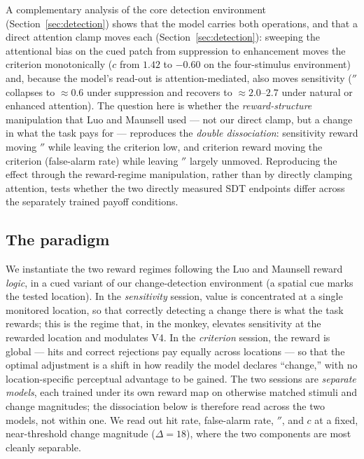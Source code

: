 A complementary analysis of the core detection environment
(Section~\ref{sec:detection}) shows that the model carries both operations, and that a
direct attention clamp moves each
(Section~\ref{sec:detection}): sweeping the attentional bias on the cued patch from
suppression to enhancement moves the criterion monotonically ($c$ from $1.42$ to
$-0.60$ on the four-stimulus environment) and, because the model's read-out is
attention-mediated, also moves sensitivity ($\dprime$ collapses to $\approx0.6$
under suppression and recovers to $\approx2.0$--$2.7$ under natural or enhanced
attention). The question here is whether the \emph{reward-structure} manipulation
that Luo and Maunsell used --- not our direct clamp, but a change in what the task
pays for --- reproduces the \emph{double dissociation}: sensitivity reward moving
$\dprime$ while leaving the criterion low, and criterion reward moving the criterion
(false-alarm rate) while leaving $\dprime$ largely unmoved. Reproducing the effect
through the reward-regime manipulation, rather than by directly clamping attention,
tests whether the two directly measured SDT endpoints differ across the separately
trained payoff conditions.

\subsection*{The paradigm}

We instantiate the two reward regimes following the Luo and Maunsell reward
\emph{logic}, in a cued variant of our change-detection environment (a spatial cue marks
the tested location). In the \emph{sensitivity} session, value is concentrated at a
single monitored location, so that correctly detecting a change there is what the
task rewards; this is the regime that, in the monkey, elevates sensitivity at the
rewarded location and modulates V4. In the \emph{criterion} session, the reward is
global --- hits and correct rejections pay equally across locations --- so that the
optimal adjustment is a shift in how readily the model declares ``change,'' with no
location-specific perceptual advantage to be gained. The two sessions are \emph{separate
models}, each trained under its own reward map on otherwise matched stimuli and change
magnitudes; the dissociation below is therefore read across the two models, not within
one. We read out hit rate, false-alarm rate, $\dprime$, and $c$ at
a fixed, near-threshold change magnitude ($\Delta = 18$), where the two components are
most cleanly separable.

